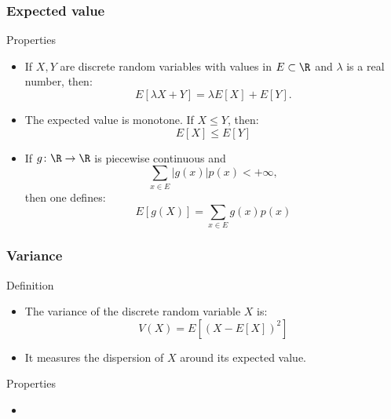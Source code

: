 \begin{frame}
    \frametitle{Expected value}
\begin{block}{Properties}
    \begin{itemize}
        \item<+-> If $X,Y$ are discrete random variables with values in $E \subset \R$ and 
        $\lambda$ is a real number, then:
        \begin{equation}
            E\left[ \lambda X + Y \right] = \lambda E\left[ X \right] + E \left[ Y \right].
        \end{equation}
        \item<+-> The expected value is monotone. If $X \leq Y$, then:
        \begin{equation}
            E\left[ X \right] \leq E \left[ Y \right]
        \end{equation}
        \item<+-> If $g \colon \R \to \R$ is piecewise continuous and
        \begin{equation}
            \sum_{x \in E} \lvert g(x) \rvert p(x) < +\infty,
        \end{equation}
        then one defines:
        \begin{equation}
            E\left[ g(X) \right] = \sum_{x \in E}  g(x) p(x)
        \end{equation}
    \end{itemize}
\end{block}
\end{frame}
\begin{frame}
    \frametitle{Variance}
\begin{block}{Definition}
    \begin{itemize}
    \item<+->
The variance of the discrete random variable $X$ is:
    \begin{equation}
        V(X) = E \left[ \left( X - E\left[ X \right] \right)^2 \right]
    \end{equation}
    \item<+-> It measures the dispersion of $X$ around its expected value.
    \end{itemize}
\end{block}
\begin{block}{Properties}
    \begin{itemize}
        \item<+->
    \end{itemize}
\end{block}

\end{frame}
